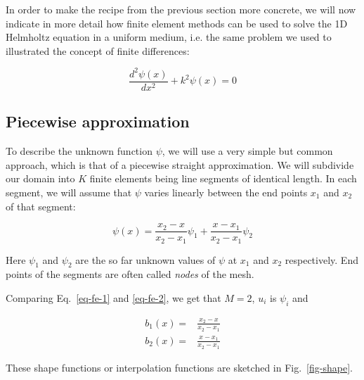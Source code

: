 \pagebreak



In order to make the recipe from the previous section more concrete, we will now indicate in more detail how finite element methods can be used to solve the 1D Helmholtz equation in a uniform medium, i.e. the same problem we used to illustrated the concept of finite differences:

\begin{equation}
\frac{d^2 \psi (x)}{d x^2} + k^2 \psi(x) = 0 \label{eq-helmholtz-1d-2}
\end{equation} 

\subsection{Piecewise approximation}

To describe the unknown function $\psi$, we will use a very simple but common approach, which is that of a piecewise straight approximation. We will subdivide our domain into $K$ finite elements being line segments of identical length. In each segment, we will assume that $\psi$ varies linearly between the end points $x_1$ and $x_2$ of that segment:

\begin{equation}
\psi(x) = \frac{x_2 - x}{x_2 - x_1} \psi_1 + \frac{x - x_1}{x_2 - x_1} \psi_2 \label{eq-fe-2}
\end{equation} 

Here $\psi_1$ and $\psi_2$ are the so far unknown values of $\psi$ at $x_1$ and $x_2$ respectively. End points of the segments are often called \emph{nodes} of the mesh.

Comparing Eq.~\ref{eq-fe-1} and \ref{eq-fe-2}, we get that $M=2$, $u_i$ is $\psi_i$ and

\begin{align}
b_1(x) =& \frac{x_2 - x}{x_2 - x_1} \\
b_2(x) =& \frac{x - x_1}{x_2 - x_1}
\end{align} 

These shape functions or interpolation functions are sketched in Fig.~\ref{fig-shape}.

